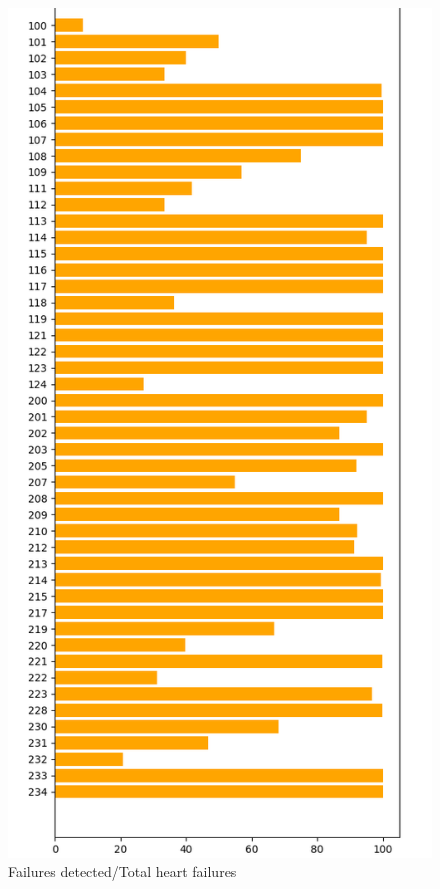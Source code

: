 \documentclass[conference]{IEEEtran}
\begin{document}
\begin{figure}[H]
\centerline{\includegraphics[scale=0.6]{imagenes/EfectividadExistentes}}
\caption{Failures detected/Total heart failures}
\label{fig}
\end{figure}
\end{document}
